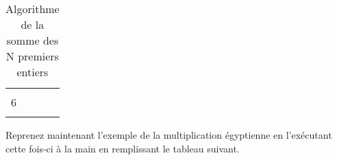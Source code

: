 \documentclass[11pt,a4paper]{article}
\begin{document}
\begin{table}[h!]
\begin{minipage}{0.4\textwidth}
\begin{tabular}{|C{1cm}|C{1cm}|C{1cm}|}
             &    &       \\
        \hline
             &    &       \\
        6    &    &       \\
             &    &       \\
        \hline
    \end{tabular}
  \end{minipage}
  \caption{Algorithme de la somme des N premiers entiers}
  \label{somme-n-premiers-entiers}
\end{table}


\newpage

\vfillFirst


Reprenez maintenant l'exemple de la multiplication égyptienne en l'exécutant cette fois-ci à la main en remplissant le tableau suivant.



\bigskip
\end{document}

